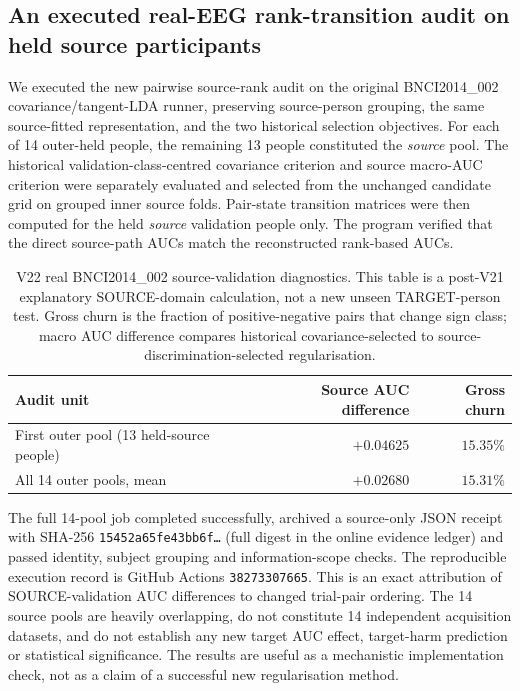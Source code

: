 \subsection{An executed real-EEG rank-transition audit on held source participants}
\label{sec:v22-real-source-rank}
We executed the new pairwise source-rank audit on the original
BNCI2014\_002 covariance/tangent-LDA runner, preserving source-person
grouping, the same source-fitted representation, and the two
historical selection objectives. For each of 14 outer-held people,
the remaining 13 people constituted the \emph{source} pool. The
historical validation-class-centred covariance criterion and source
macro-AUC criterion were separately evaluated and selected from the
unchanged candidate grid on grouped inner source folds.
Pair-state transition matrices were then computed for the held
\emph{source} validation people only. The program verified that the
direct source-path AUCs match the reconstructed rank-based AUCs.

\begin{table}[tb]
\centering\small
\caption{V22 real BNCI2014\_002 source-validation diagnostics.
This table is a post-V21 explanatory SOURCE-domain calculation,
not a new unseen TARGET-person test. Gross churn is the
fraction of positive-negative pairs that change sign class;
macro AUC difference compares historical covariance-selected
to source-discrimination-selected regularisation.}
\label{tab:v22-source-rank}
\begin{tabular}{lrr}
\toprule
Audit unit & Source AUC difference & Gross churn\\
\midrule
First outer pool (13 held-source people) & $+0.04625$ & $15.35\%$\\
All 14 outer pools, mean & $+0.02680$ & $15.31\%$\\
\bottomrule
\end{tabular}
\end{table}

The full 14-pool job completed successfully, archived a source-only
JSON receipt with SHA-256
\texttt{15452a65fe43bb6f\ldots} (full digest in the online evidence ledger)
and passed identity, subject grouping and information-scope checks.
The reproducible execution record is GitHub Actions
\texttt{38273307665}. This is an exact attribution of
SOURCE-validation AUC differences to changed trial-pair ordering.
The 14 source pools are heavily overlapping, do not constitute
14 independent acquisition datasets, and do not establish any
new target AUC effect, target-harm prediction or statistical
significance. The results are useful as a mechanistic
implementation check, not as a claim of a successful new
regularisation method.

